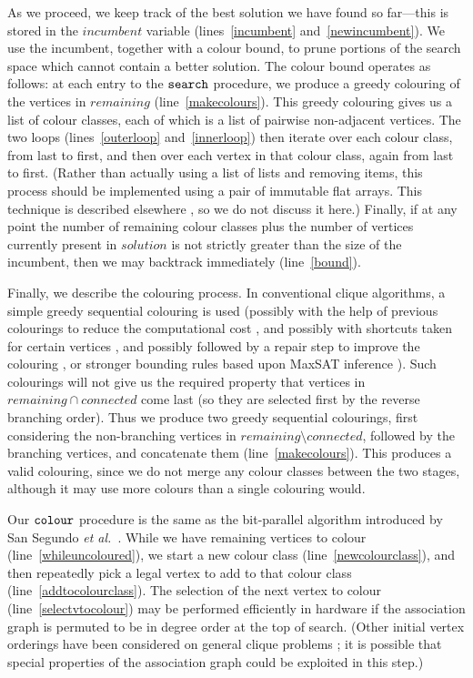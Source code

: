 \documentclass{llncs}
\newcommand{\lineref}[1]{line~\ref{#1}}
\newcommand{\twolinesref}[2]{lines~\ref{#1} and~\ref{#2}}
\begin{document}
As we proceed, we keep track of the best solution we have found so far---this is stored in the
$\mathit{incumbent}$ variable (\twolinesref{incumbent}{newincumbent}). We use the incumbent,
together with a colour bound, to prune portions of the search space which cannot contain a better
solution. The colour bound operates as follows: at each entry to the $\FuncSty{search}$ procedure,
we produce a greedy colouring of the vertices in $\mathit{remaining}$ (\lineref{makecolours}). This
greedy colouring gives us a list of colour classes, each of which is a list of pairwise non-adjacent
vertices. The two loops (\twolinesref{outerloop}{innerloop}) then iterate over each colour class,
from last to first, and then over each vertex in that colour class, again from last to first.
(Rather than actually using a list of lists and removing items, this process should be implemented
using a pair of immutable flat arrays. This technique is described elsewhere
\cite{DBLP:conf/cp/McCreeshP14}, so we do not discuss it here.) Finally, if at any point the number
of remaining colour classes plus the number of vertices currently present in $\mathit{solution}$ is
not strictly greater than the size of the incumbent, then we may backtrack immediately
(\lineref{bound}).

Finally, we describe the colouring process. In conventional clique algorithms, a simple greedy
sequential colouring is used (possibly with the help of previous colourings to reduce the
computational cost \cite{DBLP:conf/lion/NikolaevBS15}, and possibly with shortcuts taken for certain
vertices \cite{DBLP:journals/cor/SegundoT14}, and possibly followed by a repair step to
improve the colouring \cite{DBLP:conf/walcom/TomitaSHTW10}, or stronger bounding rules based upon
MaxSAT inference \cite{DBLP:conf/ictai/LiFX13,DBLP:conf/lion/LiJX15,DBLP:journals/cor/SegundoNB15}).
Such colourings will not give us the required property that vertices in $\mathit{remaining} \cap
\mathit{connected}$ come last (so they are selected first by the reverse branching order). Thus we
produce two greedy sequential colourings, first considering the non-branching vertices in
$\mathit{remaining} \setminus \mathit{connected}$, followed by the branching vertices, and
concatenate them (\lineref{makecolours}). This produces a valid colouring, since we do not merge any
colour classes between the two stages, although it may use more colours than a single colouring
would.

Our $\FuncSty{colour}$ procedure is the same as the bit-parallel algorithm introduced by San Segundo
\textit{et al.}\ \cite{DBLP:journals/cor/SegundoRJ11}. While we have remaining vertices to colour
(\lineref{whileuncoloured}), we start a new colour class (\lineref{newcolourclass}), and then
repeatedly pick a legal vertex to add to that colour class (\lineref{addtocolourclass}).  The
selection of the next vertex to colour (\lineref{selectvtocolour}) may be performed efficiently in
hardware if the association graph is permuted to be in degree order at the top of search. (Other
initial vertex orderings have been considered on general clique problems
\cite{DBLP:journals/algorithms/Prosser12,DBLP:conf/lion/SegundoLB14}; it is possible that special
properties of the association graph could be exploited in this step.)
\end{document}
